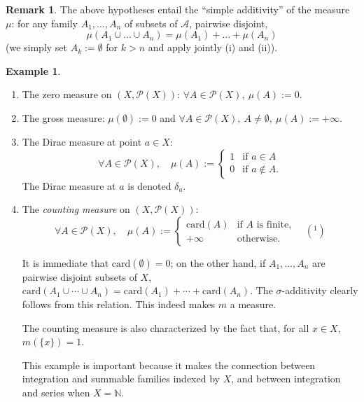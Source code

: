 \documentclass[12pt]{article}
\theoremstyle{definition}
\newtheorem{example}{Example}[section]
\newtheorem{remark}{Remark}[section]
\begin{document}
\begin{remark}
The above hypotheses entail the ``simple additivity'' of the measure $\mu$: for any family $A_1, \dots, A_n$ of subsets of $\mathscr{A}$, pairwise disjoint,
$$ \mu(A_1 \cup \dots \cup A_n) = \mu(A_1) + \dots + \mu(A_n) $$
(we simply set $A_k := \emptyset$ for $k > n$ and apply jointly (i) and (ii)).
\end{remark}

\begin{example}
\begin{enumerate}[label=\textbf{\arabic*.}, leftmargin=1.5em]
    \item The zero measure on $(X, \mathscr{P}(X))$: $\forall A \in \mathscr{P}(X), \ \mu(A) := 0$.
    \item The gross measure: $\mu(\emptyset) := 0$ and $\forall A \in \mathscr{P}(X), \ A \neq \emptyset, \ \mu(A) := +\infty$.
    \item The Dirac measure at point $a \in X$:
    \begin{equation}
    \forall A \in \mathscr{P}(X), \quad \mu(A) := \begin{cases} 1 & \text{if } a \in A \\ 0 & \text{if } a \notin A. \end{cases} \tag{6.1}
    \end{equation}
    The Dirac measure at $a$ is denoted $\delta_a$.
    \item The \textit{counting measure} on $(X, \mathscr{P}(X))$:
    $$ \forall A \in \mathscr{P}(X), \quad \mu(A) := \begin{cases} \text{card}(A) & \text{if } A \text{ is finite,} \\ +\infty & \text{otherwise.} \end{cases} \quad (^1) $$
    
    It is immediate that $\text{card}(\emptyset) = 0$; on the other hand, if $A_1, \dots, A_n$ are pairwise disjoint subsets of $X$, $\text{card}(A_1 \cup \cdots \cup A_n) = \text{card}(A_1) + \cdots + \text{card}(A_n)$. The $\sigma$-additivity clearly follows from this relation. This indeed makes $m$ a measure.
    
    The counting measure is also characterized by the fact that, for all $x \in X$, $m(\{x\}) = 1$.
    
    This example is important because it makes the connection between integration and summable families indexed by $X$, and between integration and series when $X = \mathbb{N}$.
    

\end{enumerate}
\end{example}
\end{document}
